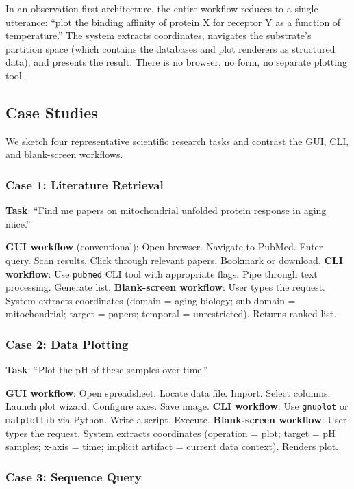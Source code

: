 \documentclass[11pt,twocolumn,a4paper]{article}
\theoremstyle{definition}
\theoremstyle{remark}
\begin{document}
In an observation-first architecture, the entire workflow reduces to a single utterance: ``plot the binding affinity of protein X for receptor Y as a function of temperature.'' The system extracts coordinates, navigates the substrate's partition space (which contains the databases and plot renderers as structured data), and presents the result. There is no browser, no form, no separate plotting tool.

\subsection{Case Studies}

We sketch four representative scientific research tasks and contrast the GUI, CLI, and blank-screen workflows.

\subsubsection{Case 1: Literature Retrieval}

\textbf{Task}: ``Find me papers on mitochondrial unfolded protein response in aging mice.''

\textbf{GUI workflow} (conventional): Open browser. Navigate to PubMed. Enter query. Scan results. Click through relevant papers. Bookmark or download.
\textbf{CLI workflow}: Use \texttt{pubmed} CLI tool with appropriate flags. Pipe through text processing. Generate list.
\textbf{Blank-screen workflow}: User types the request. System extracts coordinates (domain = aging biology; sub-domain = mitochondrial; target = papers; temporal = unrestricted). Returns ranked list.

\subsubsection{Case 2: Data Plotting}

\textbf{Task}: ``Plot the pH of these samples over time.''

\textbf{GUI workflow}: Open spreadsheet. Locate data file. Import. Select columns. Launch plot wizard. Configure axes. Save image.
\textbf{CLI workflow}: Use \texttt{gnuplot} or \texttt{matplotlib} via Python. Write a script. Execute.
\textbf{Blank-screen workflow}: User types the request. System extracts coordinates (operation = plot; target = pH samples; x-axis = time; implicit artifact = current data context). Renders plot.

\subsubsection{Case 3: Sequence Query}
\end{document}
